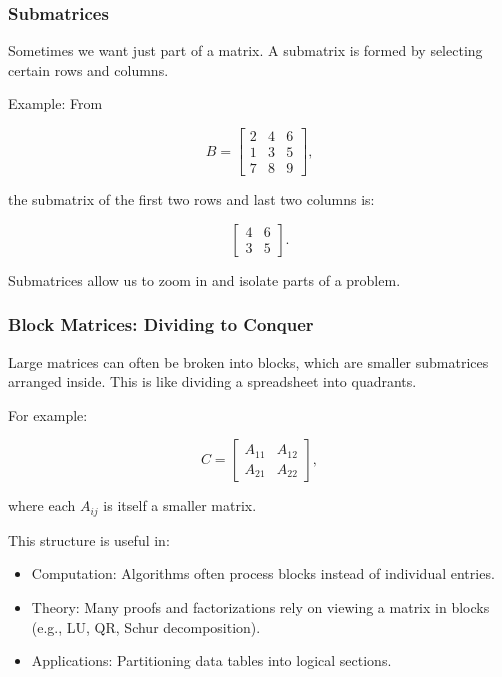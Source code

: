 \documentclass[
  letterpaper,
  DIV=11,
  numbers=noendperiod]{scrreprt}
\providecommand{\tightlist}{%
  \setlength{\itemsep}{0pt}\setlength{\parskip}{0pt}}
\begin{document}
\subsubsection{Submatrices}\label{submatrices}

Sometimes we want just part of a matrix. A submatrix is formed by
selecting certain rows and columns.

Example: From

\[
B = \begin{bmatrix} 
2 & 4 & 6 \\ 
1 & 3 & 5 \\ 
7 & 8 & 9 
\end{bmatrix},
\]

the submatrix of the first two rows and last two columns is:

\[
\begin{bmatrix} 
4 & 6 \\ 
3 & 5 
\end{bmatrix}.
\]

Submatrices allow us to zoom in and isolate parts of a problem.

\subsubsection{Block Matrices: Dividing to
Conquer}\label{block-matrices-dividing-to-conquer}

Large matrices can often be broken into blocks, which are smaller
submatrices arranged inside. This is like dividing a spreadsheet into
quadrants.

For example:

\[
C = \begin{bmatrix} 
A_{11} & A_{12} \\ 
A_{21} & A_{22} 
\end{bmatrix},
\]

where each \(A_{ij}\) is itself a smaller matrix.

This structure is useful in:

\begin{itemize}
\tightlist
\item
  Computation: Algorithms often process blocks instead of individual
  entries.
\item
  Theory: Many proofs and factorizations rely on viewing a matrix in
  blocks (e.g., LU, QR, Schur decomposition).
\item
  Applications: Partitioning data tables into logical sections.
\end{itemize}
\end{document}

